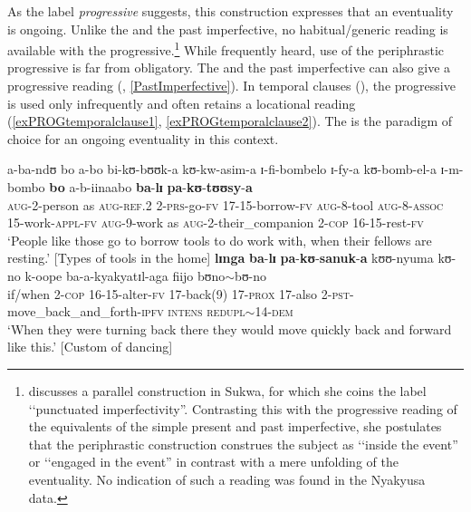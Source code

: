 As the label \textit{progressive} suggests, this construction expresses that an eventuality is ongoing. Unlike the  and the past imperfective, no habitual/generic reading is available with the progressive.\footnote{\citet[168--174]{KershnerT2002} discusses a parallel construction in Sukwa, for which she coins the label \lq\lq punctuated imperfectivity''. Contrasting this with the progressive reading of the  equivalents of the simple present and past imperfective, she postulates that the periphrastic construction construes the subject as \lq\lq inside the event'' or \lq\lq engaged in the event'' in contrast with a mere unfolding of the eventuality. No indication of such a reading was found in the Nyakyusa data.} While frequently heard, use of the periphrastic progressive is far from obligatory. The  and the past imperfective can also give a progressive reading  (, \ref{PastImperfective}).
In temporal clauses (), the progressive is used only infrequently and often retains a locational reading (\ref{exPROGtemporalclause1}, \ref{exPROGtemporalclause2}). The  is the paradigm of choice for an ongoing eventuality in this context.

\begin{exe}
\ex \label{exPROGtemporalclause1}
\gll a-ba-ndʊ bo a-bo bi-kʊ-bʊʊk-a kʊ-kw-asim-a ɪ-fi-bombelo ɪ-fy-a kʊ-bomb-el-a ɪ-m-bombo \textbf{bo} a-b-iinaabo \textbf{ba}-\textbf{lɪ} \textbf{pa}-\textbf{kʊ}-\textbf{tʊʊsy}-\textbf{a}\\
\textsc{aug}-2-person as \textsc{aug}-\textsc{ref.2} 2-\textsc{prs}-go-\textsc{fv} 17-15-borrow-\textsc{fv} \textsc{aug}-8-tool \textsc{aug}-8-\textsc{assoc} 15-work-\textsc{appl}-\textsc{fv} \textsc{aug}-9-work as \textsc{aug}-2-their\_companion 2-\textsc{cop} 16-15-rest-\textsc{fv}\\
\glt \lq People like those go to borrow tools to do work with, when their fellows are resting.' [Types of tools in the home]
\ex \label{exPROGtemporalclause2}
\gll \textbf{lɪnga} \textbf{ba}-\textbf{lɪ} \textbf{pa}-\textbf{kʊ}-\textbf{sanuk}-\textbf{a} kʊʊ-nyuma kʊ-no k-oope ba-a-kyakyatɪl-aga fiijo bʊno$\sim$bʊ-no\\
if/when 2-\textsc{cop} 16-15-alter-\textsc{fv} 17-back(9) 17-\textsc{prox} 17-also 2-\textsc{pst}-move\_back\_and\_forth-\textsc{ipfv} \textsc{intens} \textsc{redupl}$\sim$14-\textsc{dem}\\
\glt \lq When they were turning back there they would move quickly back and forward like this.' [Custom of dancing]
\end{exe}

